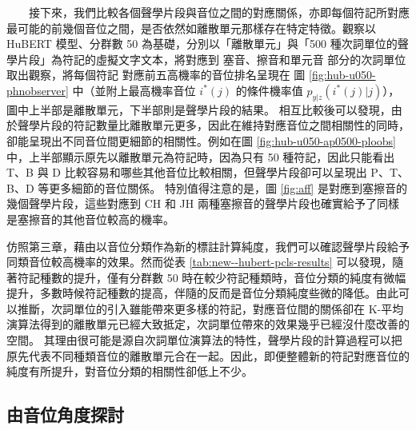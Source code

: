 　　接下來，我們比較各個聲學片段與音位之間的對應關係，亦即每個符記所對應最可能的前幾個音位之間，是否依然如離散單元那樣存在特定特徵。觀察以 HuBERT 模型、分群數 50 為基礎，分別以「離散單元」與「500 種次詞單位的聲學片段」為符記的虛擬文字文本，將對應到
塞音、擦音和單元音
部分的次詞單位取出觀察，將每個符記
對應前五高機率的音位排名呈現在
圖 \ref{fig:hub-u050-phnobserver} 中（並附上最高機率音位 $i^*(j)$ 的條件機率值 $p_{y|z}(i^*(j)|j)$），圖中上半部是離散單元，下半部則是聲學片段的結果。
相互比較後可以發現，由於聲學片段的符記數量比離散單元更多，因此在維持對應音位之間相關性的同時，卻能呈現出不同音位間更細節的相關性。例如在圖 \ref{fig:hub-u050-ap0500-ploobs} 中，上半部顯示原先以離散單元為符記時，因為只有 50 種符記，因此只能看出 T、B 與 D 比較容易和哪些其他音位比較相關，但聲學片段卻可以呈現出 P、T、B、D 等更多細節的音位關係。
特別值得注意的是，圖 \ref{fig:aff} 是對應到塞擦音的幾個聲學片段，這些對應到 CH 和 JH 兩種塞擦音的聲學片段也確實給予了同樣是塞擦音的其他音位較高的機率。

        仿照第三章，藉由以音位分類作為新的標註計算純度，我們可以確認聲學片段給予同類音位較高機率的效果。然而從表 \ref{tab:new--hubert-pcls-results} 可以發現，隨著符記種數的提升，僅有分群數 50 時在較少符記種類時，音位分類的純度有微幅提升，多數時候符記種數的提高，伴隨的反而是音位分類純度些微的降低。由此可以推斷，次詞單位的引入雖能帶來更多樣的符記，對應音位間的關係卻在 K-平均演算法得到的離散單元已經大致抵定，次詞單位帶來的效果幾乎已經沒什麼改善的空間。
其理由很可能是源自次詞單位演算法的特性，聲學片段的計算過程可以把原先代表不同種類音位的離散單元合在一起。因此，即便整體新的符記對應音位的純度有所提升，對音位分類的相關性卻低上不少。  

\subsection{由音位角度探討}


